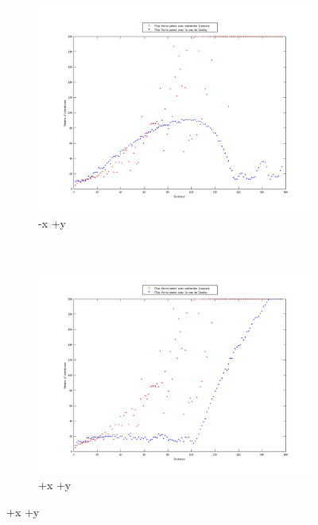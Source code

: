 \documentclass[11pt,a4paper,twoside,onecolumn,titlepage]{report}
\begin{document}
\begin{enumerate}[(a)]
\begin{figure}[h!]
    \centering
	\begin{subfigure}[t]{0.5\textwidth}
		\centering
		\includegraphics[scale=0.4]{steps-quarter-4}
		\caption{-x +y}
		\label{fig:rlVSqnQ4}
	\end{subfigure}%
        ~ %
    \begin{subfigure}[t]{0.5\textwidth}
		\centering
		\includegraphics[scale=0.4]{steps-quarter-3}
		\caption{+x +y}
		\label{fig:fig:rlVSqnQ3}
	\end{subfigure}


\end{figure}
\end{enumerate}
\end{document}
